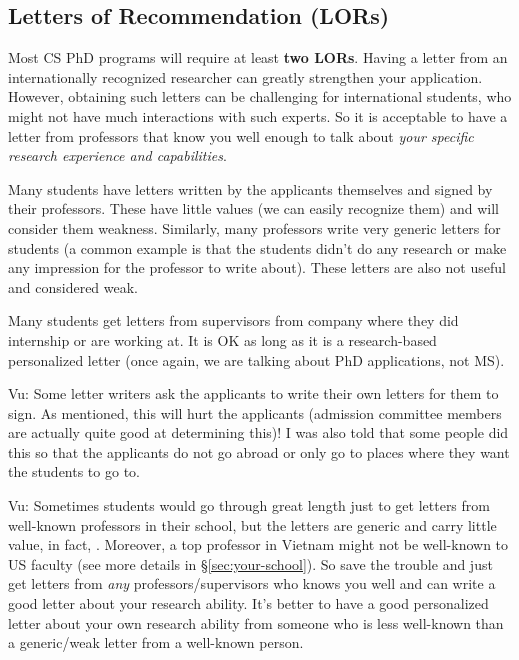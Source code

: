 \documentclass[11pt]{article}
\newenvironment{commentbox}{
 \small
    \begin{cbox}
 }{
   \end{cbox}
}
\newcommand{\red}[1]{{\color{red}{#1}}}
\begin{document}
\subsection{Letters of Recommendation (LORs)}

Most CS PhD programs will require at least \textbf{two LORs}. Having a letter from an internationally recognized researcher can greatly strengthen your application. However, obtaining such letters
can be challenging for international students, who might not have much interactions with such experts. So it is acceptable to have a letter from professors that know you well enough to talk about \emph{your specific research experience and capabilities}.


Many students have letters written by the applicants themselves and signed by their professors. These have little
values (we can easily recognize them) and will consider them weakness.
Similarly, many professors write very generic letters for students (a common example is that the students didn't do any
research or make any impression for the professor to write about). These letters are also not useful and considered weak.

Many students get letters from supervisors from company where they did internship or are
working at. It is OK as long as it is a research-based personalized
letter (once again, we are talking about PhD applications, not MS).

\begin{commentbox}
Vu: Some letter writers ask the applicants to write their own letters for them to sign. As mentioned, this will hurt the applicants (admission committee members are actually quite good at determining this)! I was also told that some people did this so that the applicants do not go abroad or only go to places where they want the students to go to.
\end{commentbox}



\begin{commentbox}
Vu: Sometimes students would go through great length just to get letters from well-known professors in their school, but the letters are generic and carry little value, in fact, \red{red flags}. Moreover, a top professor in Vietnam might not be well-known to US faculty (see more details in \S\ref{sec:your-school}). So save the trouble and just get letters from \emph{any} professors/supervisors who knows you well and can write a good letter about your research ability. It's better to have a good personalized
letter about your own research ability from someone who is less
well-known than a generic/weak letter from a well-known person.
\end{commentbox}
\end{document}
